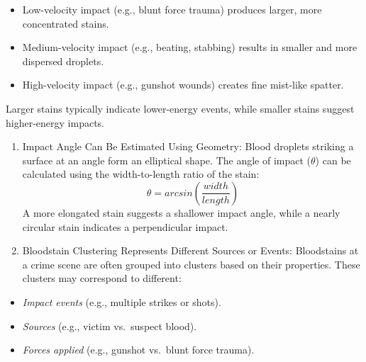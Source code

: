 \documentclass[11pt]{article}
\providecommand{\tightlist}{%
      \setlength{\itemsep}{0pt}\setlength{\parskip}{0pt}}
\begin{document}
\begin{itemize}
\tightlist
\item
  Low-velocity impact (e.g., blunt force trauma) produces larger, more
  concentrated stains.
\item
  Medium-velocity impact (e.g., beating, stabbing) results in smaller
  and more dispersed droplets.
\item
  High-velocity impact (e.g., gunshot wounds) creates fine mist-like
  spatter.
\end{itemize}

Larger stains typically indicate lower-energy events, while smaller
stains suggest higher-energy impacts.

\begin{enumerate}
\def\labelenumi{\arabic{enumi}.}
\setcounter{enumi}{2}
\item
  Impact Angle Can Be Estimated Using Geometry: Blood droplets striking
  a surface at an angle form an elliptical shape. The angle of impact
  (\(\theta\)) can be calculated using the width-to-length ratio of the
  stain: \[\theta=arcsin\left(\frac{width}{length}\right)\] A more
  elongated stain suggests a shallower impact angle, while a nearly
  circular stain indicates a perpendicular impact.
\item
  Bloodstain Clustering Represents Different Sources or Events:
  Bloodstains at a crime scene are often grouped into clusters based on
  their properties. These clusters may correspond to different:
\end{enumerate}

\begin{itemize}
\tightlist
\item
  \emph{Impact events} (e.g., multiple strikes or shots).
\item
  \emph{Sources} (e.g., victim vs.~suspect blood).
\item
  \emph{Forces applied} (e.g., gunshot vs.~blunt force trauma).
\end{itemize}
\end{document}
